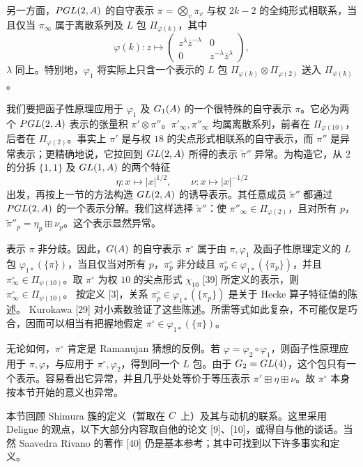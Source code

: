 另一方面，$PGL(2,A)$ 的自守表示 $\pi=\bigotimes_v\pi_v$ 与权
$2k-2$ 的全纯形式相联系，当且仅当 $\pi_\infty$ 属于离散系列及 $L$ 包
$\Pi_{\varphi(k)}$，其中
\[
\varphi(k):z\longmapsto
\begin{pmatrix}z^\lambda\overline z^{-\lambda}&0\\
0&z^{-\lambda}\overline z^\lambda\end{pmatrix},
\]
$\lambda$ 同上。特别地，$\varphi_1$ 将实际上只含一个表示的 $L$ 包
$\Pi_{\varphi(k)}\otimes\Pi_{\varphi(2)}$ 送入 $\Pi_{\psi(k)}$。

我们要把函子性原理应用于 $\varphi_1$ 及 $G_1(A)$ 的一个很特殊的自守表示
$\pi$。它必为两个 $PGL(2,A)$ 表示的张量积
$\pi'\otimes\pi''$。$\pi'_\infty,\pi''_\infty$ 均属离散系列，前者在
$\Pi_{\varphi(10)}$，后者在 $\Pi_{\varphi(2)}$。事实上 $\pi'$ 是与权 $18$ 的尖点形式相联系的自守表示，而
$\pi''$ 是异常表示；更精确地说，它拉回到 $GL(2,A)$ 所得的表示
$\widetilde\pi''$ 异常。为构造它，从 $2$ 的分拆 $\{1,1\}$ 及
$GL(1,A)$ 的两个特征
\[
\eta:x\longmapsto|x|^{1/2},\qquad\nu:x\longmapsto|x|^{-1/2}
\]
出发，再按上一节的方法构造 $GL(2,A)$ 的诱导表示。其任意成员
$\widetilde\pi''$ 都通过 $PGL(2,A)$ 的一个表示分解。我们这样选择
$\widetilde\pi''$：使 $\pi''_\infty\in\Pi_{\varphi(2)}$，且对所有 $p$，
$\widetilde\pi''_p=\eta_p\boxplus\nu_p$。这个表示显然异常。

表示 $\pi$ 非分歧。因此，$G(A)$ 的自守表示 $\pi^\circ$ 属于由
$\pi,\varphi_1$ 及函子性原理定义的 $L$ 包 $\varphi_{1*}(\{\pi\})$，当且仅当对所有
$p$，$\pi_p^\circ$ 非分歧且 $\pi_p^\circ\in\varphi_{1*}(\{\pi_p\})$，并且
$\pi_\infty^\circ\in\Pi_{\psi(10)}$。取 $\pi^\circ$ 为权 $10$ 的尖点形式
$\chi_{10}$ [39] 所定义的表示，则 $\pi_\infty^\circ\in\Pi_{\psi(10)}$。
按定义 [3]，关系 $\pi_p^\circ\in\varphi_{1*}(\{\pi_p\})$ 是关于 Hecke 算子特征值的陈述。
Kurokawa [29] 对小素数验证了这些陈述。所需等式如此复杂，不可能仅是巧合，因而可以相当有把握地假定
$\pi^\circ\in\varphi_{1*}(\{\pi\})$。

无论如何，$\pi^\circ$ 肯定是 Ramanujan 猜想的反例。若
$\varphi=\varphi_2\circ\varphi_1$，则函子性原理应用于 $\pi,\varphi$，与应用于
$\pi^\circ,\varphi_2$，得到同一个 $L$ 包。由于 $G_2=GL(4)$，这个包只有一个表示。容易看出它异常，并且几乎处处等价于等压表示
$\pi'\boxplus\eta\boxplus\nu$。故 $\pi^\circ$ 本身按本节开始的意义也异常。

本节回顾 Shimura 簇的定义（暂取在 $C$ 上）及其与动机的联系。这里采用 Deligne 的观点，以下大部分内容取自他的论文
[9]、[10]，或得自与他的谈话。当然 Saavedra Rivano 的著作 [40] 仍是基本参考；其中可找到以下许多事实和定义。


